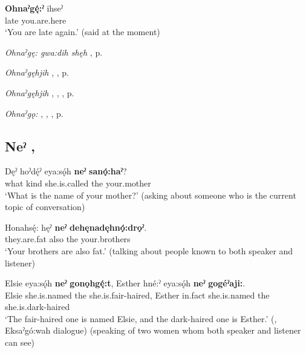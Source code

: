 \ea
\label{ex:npar1}
\gll \textbf{Ohnaˀgę́:ˀ} ihseˀ\\
late you.are.here\\
\glt ‘You are late again.’ (said at the moment)
\z


\begin{CayugaRelated}
\item \textit{Ohnaˀgę: gwa:dih shęh} , p. \pageref{p:[ohnaˀgę: gwa:dih shęh]}\\
\item \textit{Ohnaˀgęhjih} , , p. \pageref{p:[ohnaˀgęhjih] ‘late’}\\
\item \textit{Ohnaˀgęhjih} , , , p. \pageref{p:[ohnaˀgęhjih] ‘late’}\\
\item \textit{Ohnaˀgǫ:} , , , p. \pageref{p:[ohnaˀgǫ:]}
\end{CayugaRelated}

\subsection*{\textbf{Neˀ} , } \label{p:[neˀ]}

\ea
\label{ex:npar2}
\gll Dęˀ hoˀdę́ˀ eya:sǫ́h \textbf{neˀ} \textbf{sanǫ́:haˀ}?\\
what kind she.is.called the your.mother\\
\glt ‘What is the name of your mother?’ (asking about someone who is the current topic of conversation)
\z

\ea
\label{ex:npar3}
\gll Honahsę́: hęˀ \textbf{neˀ} \textbf{dehęnadęhnǫ́:drǫˀ}.\\
they.are.fat also the your.brothers\\
\glt ‘Your brothers are also fat.’ (talking about people known to both speaker and listener)
\z

\ea
\label{ex:npar4}
\gll Elsie eya:sǫ́h \textbf{neˀ} \textbf{gonǫhgę́:t}, Esther hné:ˀ eya:sǫ́h \textbf{neˀ} \textbf{gogéˀaji:}.\\
Elsie she.is.named the she.is.fair-haired, Esther in.fact she.is.named the she.is.dark-haired\\
\glt ‘The fair-haired one is named Elsie, and the dark-haired one is Esther.’ (\cite[88]{mithun_watewayestanih_1984}, Eksaˀgó:wah dialogue) (speaking of two women whom both speaker and listener can see)
\z

